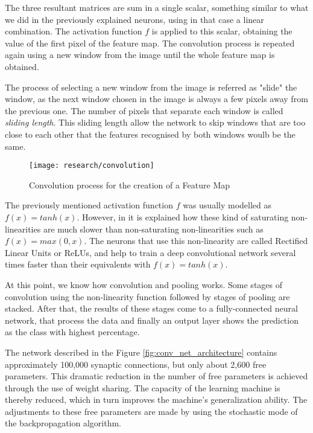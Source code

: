 The three resultant matrices are sum in a single scalar, something similar to what we did in the previously explained neurons, using in that case a linear combination. The activation function $f$ is applied to this scalar, obtaining the value of the first pixel of the feature map. The convolution process is repeated again using a new window from the image until the whole feature map is obtained. 

The process of selecting a new window from the image is referred as "slide" the window, as the next window chosen in the image is always a few pixels away from the previous one. The number of pixels that separate each window is called \textit{sliding length}. This sliding length allow the network to skip windows that are too close to each other that the features recognised by both windows woulb be the same.

\begin{figure}[!ht]
	\centering
	\texttt{[image: research/convolution]}
	\caption{Convolution process for the creation of a Feature Map}
	\label{fig:convol_creation_feature_map}
\end{figure}

The previously mentioned activation function $f$ was usually modelled as $f(x)=tanh(x)$. However, in \cite{krizhevsky2012deep} it is explained how these kind of saturating non-linearities are much slower than non-saturating non-linearities such as $f(x)=max(0, x)$. The neurons that use this non-linearity are called Rectified Linear Units or ReLUs, and help to train a deep convolutional network several times faster than their equivalents with $f(x)=tanh(x)$.

At this point, we know how convolution and pooling works. Some stages of convolution using the non-linearity function followed by stages of pooling are stacked. After that, the results of these stages come to a fully-connected neural network, that process the data and finally an output layer shows the prediction as the class with highest percentage.

The network described in the Figure \ref{fig:conv_net_architecture} contains approximately 100,000 synaptic connections, but only about 2,600 free parameters. This dramatic reduction in the number of free parameters is achieved through the use of weight sharing. The capacity of the learning machine is thereby reduced, which in turn improves the machine’s generalization ability. The adjustments to these free parameters are made by using the stochastic mode of the backpropagation algorithm.


